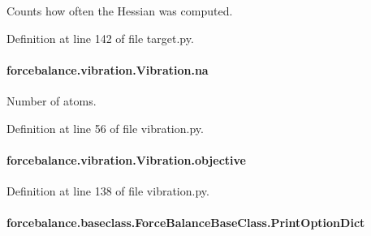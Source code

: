 Counts how often the Hessian was computed. 



Definition at line 142 of file target.\-py.

\hypertarget{classforcebalance_1_1vibration_1_1Vibration_a31148c4d3157dddf2485c4e63496e120}{
\paragraph[{na}]{\setlength{\rightskip}{0pt plus 5cm}forcebalance.\-vibration.\-Vibration.\-na}}\label{classforcebalance_1_1vibration_1_1Vibration_a31148c4d3157dddf2485c4e63496e120}


Number of atoms. 



Definition at line 56 of file vibration.\-py.

\hypertarget{classforcebalance_1_1vibration_1_1Vibration_a78813cc16da8d8c6a8113e3301c96c0d}{
\paragraph[{objective}]{\setlength{\rightskip}{0pt plus 5cm}forcebalance.\-vibration.\-Vibration.\-objective}}\label{classforcebalance_1_1vibration_1_1Vibration_a78813cc16da8d8c6a8113e3301c96c0d}


Definition at line 138 of file vibration.\-py.

\hypertarget{classforcebalance_1_1baseclass_1_1ForceBalanceBaseClass_a5c55e661e746d1a4443f4e0bc34ebe05}{
\paragraph[{Print\-Option\-Dict}]{\setlength{\rightskip}{0pt plus 5cm}forcebalance.\-baseclass.\-Force\-Balance\-Base\-Class.\-Print\-Option\-Dict\hspace{0.3cm}{\ttfamily [inherited]}}}\label{classforcebalance_1_1baseclass_1_1ForceBalanceBaseClass_a5c55e661e746d1a4443f4e0bc34ebe05}


